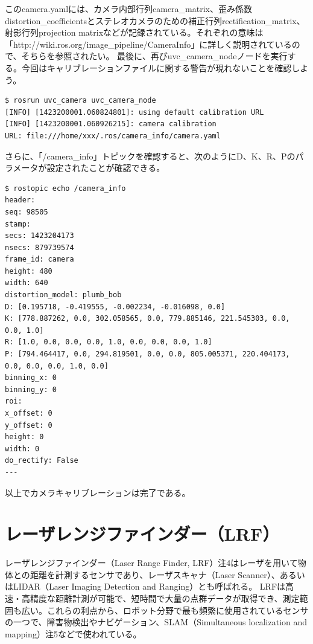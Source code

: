 このcamera.yamlには、カメラ内部行列camera\_matrix、歪み係数distortion\_coefficientsとステレオカメラのための補正行列rectification\_matrix、射影行列projection matrixなどが記録されている。それぞれの意味は「http://wiki.ros.org/image\_pipeline/CameraInfo」に詳しく説明されているので、そちらを参照されたい。
最後に、再びuvc\_camera\_nodeノードを実行する。今回はキャリブレーションファイルに関する警告が現れないことを確認しよう。

\begin{lstlisting}[language=ROS]
$ rosrun uvc_camera uvc_camera_node
[INFO] [1423200001.060824801]: using default calibration URL
[INFO] [1423200001.060926215]: camera calibration
URL: file:///home/xxx/.ros/camera_info/camera.yaml
\end{lstlisting}

さらに、「/camera\_info」トピックを確認すると、次のようにD、K、R、Pのパラメータが設定されたことが確認できる。

\begin{lstlisting}[language=ROS]
$ rostopic echo /camera_info
header:
seq: 98505
stamp:
secs: 1423204173
nsecs: 879739574
frame_id: camera
height: 480
width: 640
distortion_model: plumb_bob
D: [0.195718, -0.419555, -0.002234, -0.016098, 0.0]
K: [778.887262, 0.0, 302.058565, 0.0, 779.885146, 221.545303, 0.0, 0.0, 1.0]
R: [1.0, 0.0, 0.0, 0.0, 1.0, 0.0, 0.0, 0.0, 1.0]
P: [794.464417, 0.0, 294.819501, 0.0, 0.0, 805.005371, 220.404173, 0.0, 0.0, 0.0, 1.0, 0.0]
binning_x: 0
binning_y: 0
roi:
x_offset: 0
y_offset: 0
height: 0
width: 0
do_rectify: False
---
\end{lstlisting}

以上でカメラキャリブレーションは完了である。

\section{レーザレンジファインダー（LRF）}

レーザレンジファインダー（Laser Range Finder, LRF）注4はレーザを用いて物体との距離を計測するセンサであり、レーザスキャナ（Laser Scanner）、あるいはLIDAR（Laser Imaging Detection and Ranging）とも呼ばれる。
LRFは高速・高精度な距離計測が可能で、短時間で大量の点群データが取得でき、測定範囲も広い。これらの利点から、ロボット分野で最も頻繁に使用されているセンサの一つで、障害物検出やナビゲーション、SLAM（Simultaneous localization and mapping）注5などで使われている。

